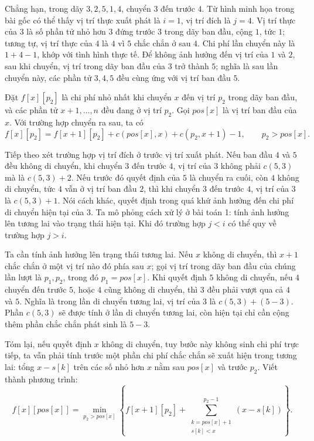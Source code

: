 \documentclass[11pt]{article}
\begin{document}
Chẳng hạn, trong dãy $3,2,5,1,4$, chuyển $3$ đến trước $4$. Từ hình minh họa
trong bài gốc có thể thấy vị trí thực xuất phát là $i=1$, vị trí đích là
$j=4$. Vị trí thực của $3$ là số phần tử nhỏ hơn $3$ đứng trước $3$ trong dãy
ban đầu, cộng $1$, tức $1$; tương tự, vị trí thực của $4$ là $4$ vì $5$ chắc
chắn ở sau $4$. Chi phí lần chuyển này là $1+4-1$, khớp với tình hình thực tế.
Để không ảnh hưởng đến vị trí của $1$ và $2$, sau khi chuyển, vị trí trong dãy
ban đầu của $3$ trở thành $5$; nghĩa là sau lần chuyển này, các phần tử
$3,4,5$ đều cùng ứng với vị trí ban đầu $5$.

Đặt $f[x][p_2]$ là chi phí nhỏ nhất khi chuyển $x$ đến vị trí $p_2$ trong dãy
ban đầu, và các phần tử $x+1,\ldots,n$ đều đang ở vị trí $p_2$. Gọi
$\mathit{pos}[x]$ là vị trí ban đầu của $x$. Với trường hợp chuyển ra sau, ta
có
\[
  f[x][p_2]=f[x+1][p_2]+c(\mathit{pos}[x],x)+c(p_2,x+1)-1,
  \qquad p_2>\mathit{pos}[x].
\]

Tiếp theo xét trường hợp vị trí đích ở trước vị trí xuất phát. Nếu ban đầu
$4$ và $5$ đều không di chuyển, khi chuyển $3$ đến trước $4$, vị trí của $3$
không phải $c(5,3)$ mà là $c(5,3)+2$. Nếu trước đó quyết định của $5$ là
chuyển ra cuối, còn $4$ không di chuyển, tức $4$ vẫn ở vị trí ban đầu $2$, thì
khi chuyển $3$ đến trước $4$, vị trí của $3$ là $c(5,3)+1$. Nói cách khác,
quyết định trong quá khứ ảnh hưởng đến chi phí di chuyển hiện tại của $3$.
Ta mô phỏng cách xử lý ở bài toán 1: tính ảnh hưởng lên tương lai vào trạng
thái hiện tại. Khi đó trường hợp $j<i$ có thể quy về trường hợp $j>i$.

Ta cần tính ảnh hưởng lên trạng thái tương lai. Nếu $x$ không di chuyển, thì
$x+1$ chắc chắn ở một vị trí nào đó phía sau $x$; gọi vị trí trong dãy ban đầu
của chúng lần lượt là $p_1,p_2$, trong đó $p_1=\mathit{pos}[x]$. Khi quyết
định $5$ không di chuyển, nếu $4$ chuyển đến trước $5$, hoặc $4$ cũng không di
chuyển, thì $3$ đều phải vượt qua cả $4$ và $5$. Nghĩa là trong lần di chuyển
tương lai, vị trí của $3$ là $c(5,3)+(5-3)$. Phần $c(5,3)$ sẽ được tính ở lần
di chuyển tương lai, còn hiện tại chỉ cần cộng thêm phần chắc chắn phát sinh
là $5-3$.

Tóm lại, nếu quyết định $x$ không di chuyển, tuy bước này không sinh chi phí
trực tiếp, ta vẫn phải tính trước một phần chi phí chắc chắn sẽ xuất hiện
trong tương lai: tổng $x-s[k]$ trên các số nhỏ hơn $x$ nằm sau
\(\mathit{pos}[x]\) và trước $p_2$. Viết thành phương trình:
\[
  f[x][\mathit{pos}[x]]
  =
  \min_{p_2>\mathit{pos}[x]}
  \left\{
    f[x+1][p_2]
    +\sum_{\substack{k=\mathit{pos}[x]+1\\ s[k]<x}}^{p_2-1}(x-s[k])
  \right\}.
\]
\end{document}
